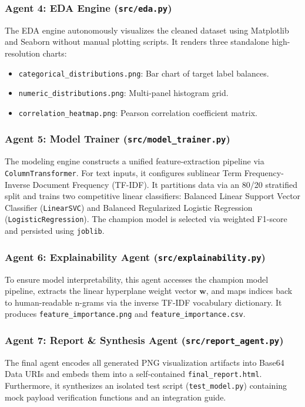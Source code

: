 \documentclass[conference]{IEEEtran}
\begin{document}
\subsubsection{Agent 4: EDA Engine (\texttt{src/eda.py})}
The EDA engine autonomously visualizes the cleaned dataset using Matplotlib and Seaborn without manual plotting scripts. It renders three standalone high-resolution charts:
\begin{itemize}
    \item \texttt{categorical\_distributions.png}: Bar chart of target label balances.
    \item \texttt{numeric\_distributions.png}: Multi-panel histogram grid.
    \item \texttt{correlation\_heatmap.png}: Pearson correlation coefficient matrix.
\end{itemize}

\subsubsection{Agent 5: Model Trainer (\texttt{src/model\_trainer.py})}
The modeling engine constructs a unified feature-extraction pipeline via \texttt{ColumnTransformer}. For text inputs, it configures sublinear Term Frequency-Inverse Document Frequency (TF-IDF). It partitions data via an 80/20 stratified split and trains two competitive linear classifiers: Balanced Linear Support Vector Classifier (\texttt{LinearSVC}) and Balanced Regularized Logistic Regression (\texttt{LogisticRegression}). The champion model is selected via weighted F1-score and persisted using \texttt{joblib}.

\subsubsection{Agent 6: Explainability Agent (\texttt{src/explainability.py})}
To ensure model interpretability, this agent accesses the champion model pipeline, extracts the linear hyperplane weight vector $\mathbf{w}$, and maps indices back to human-readable n-grams via the inverse TF-IDF vocabulary dictionary. It produces \texttt{feature\_importance.png} and \texttt{feature\_importance.csv}.

\subsubsection{Agent 7: Report \& Synthesis Agent (\texttt{src/report\_agent.py})}
The final agent encodes all generated PNG visualization artifacts into Base64 Data URIs and embeds them into a self-contained \texttt{final\_report.html}. Furthermore, it synthesizes an isolated test script (\texttt{test\_model.py}) containing mock payload verification functions and an integration guide.
\end{document}
